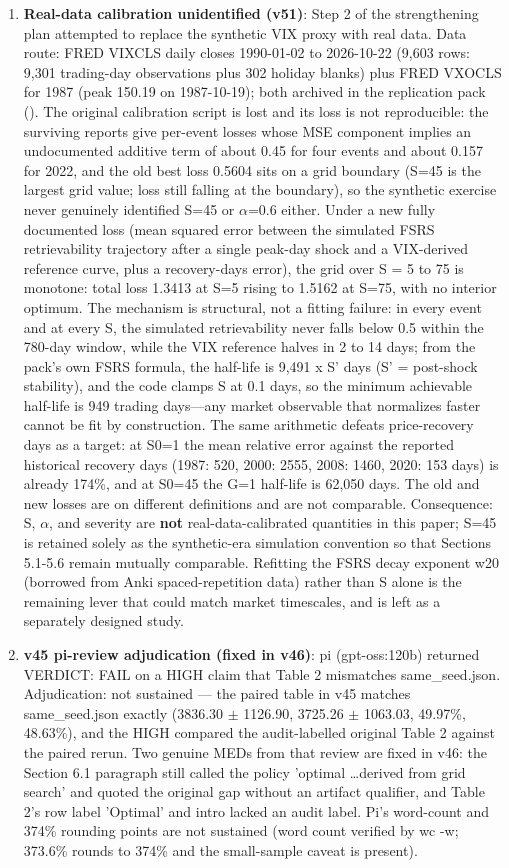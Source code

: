 \documentclass[11pt]{article}
\begin{document}
\begin{enumerate}
\item \textbf{Real-data calibration unidentified (v51)}: Step 2 of the strengthening plan attempted to replace the synthetic VIX proxy with real data. Data route: FRED VIXCLS daily closes 1990-01-02 to 2026-10-22 (9,603 rows: 9,301 trading-day observations plus 302 holiday blanks) plus FRED VXOCLS for 1987 (peak 150.19 on 1987-10-19); both archived in the replication pack (). The original calibration script is lost and its loss is not reproducible: the surviving reports give per-event losses whose MSE component implies an undocumented additive term of about 0.45 for four events and about 0.157 for 2022, and the old best loss 0.5604 sits on a grid boundary (S=45 is the largest grid value; loss still falling at the boundary), so the synthetic exercise never genuinely identified S=45 or $\alpha$=0.6 either. Under a new fully documented loss (mean squared error between the simulated FSRS retrievability trajectory after a single peak-day shock and a VIX-derived reference curve, plus a recovery-days error), the grid over S = 5 to 75 is monotone: total loss 1.3413 at S=5 rising to 1.5162 at S=75, with no interior optimum. The mechanism is structural, not a fitting failure: in every event and at every S, the simulated retrievability never falls below 0.5 within the 780-day window, while the VIX reference halves in 2 to 14 days; from the pack's own FSRS formula, the half-life is 9,491 x S' days (S' = post-shock stability), and the code clamps S at 0.1 days, so the minimum achievable half-life is 949 trading days---any market observable that normalizes faster cannot be fit by construction. The same arithmetic defeats price-recovery days as a target: at S0=1 the mean relative error against the reported historical recovery days (1987: 520, 2000: 2555, 2008: 1460, 2020: 153 days) is already 174\%, and at S0=45 the G=1 half-life is 62,050 days. The old and new losses are on different definitions and are not comparable. Consequence: S, $\alpha$, and severity are \textbf{not} real-data-calibrated quantities in this paper; S=45 is retained solely as the synthetic-era simulation convention so that Sections 5.1-5.6 remain mutually comparable. Refitting the FSRS decay exponent w20 (borrowed from Anki spaced-repetition data) rather than S alone is the remaining lever that could match market timescales, and is left as a separately designed study.
\item \textbf{v45 pi-review adjudication (fixed in v46)}: pi (gpt-oss:120b) returned VERDICT: FAIL on a HIGH claim that Table 2 mismatches same\_seed.json. Adjudication: not sustained --- the paired table in v45 matches same\_seed.json exactly (3836.30 $\pm$ 1126.90, 3725.26 $\pm$ 1063.03, 49.97\%, 48.63\%), and the HIGH compared the audit-labelled original Table 2 against the paired rerun. Two genuine MEDs from that review are fixed in v46: the Section 6.1 paragraph still called the policy 'optimal \ldots derived from grid search' and quoted the original gap without an artifact qualifier, and Table 2's row label 'Optimal' and intro lacked an audit label. Pi's word-count and 374\% rounding points are not sustained (word count verified by wc -w; 373.6\% rounds to 374\% and the small-sample caveat is present).
\end{enumerate}
\end{document}
